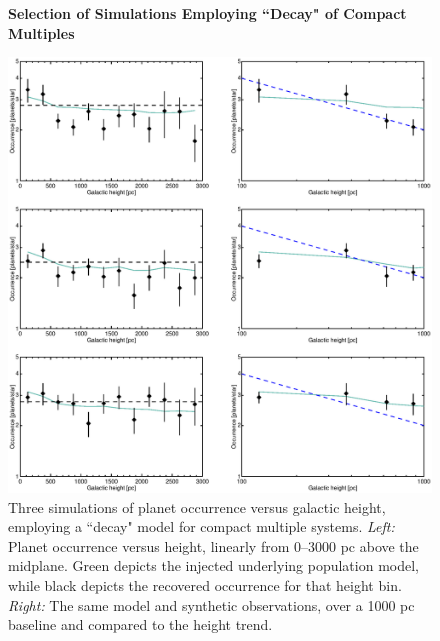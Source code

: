 \documentclass[twocolumn]{aastex631}
\begin{document}
\begin{figure}
    \centering
    \textbf{Selection of Simulations Employing ``Decay" of Compact Multiples}\par\medskip
    \includegraphics[trim={0.5cm 0 0.5cm 0}, width=6.0in]{figures/occurrence_height_kepler_decay.eps}
    \caption{Three simulations of planet occurrence versus galactic height, employing a ``decay" model for compact multiple systems. \textit{Left:} Planet occurrence versus height, linearly from 0--3000 pc above the midplane. Green depicts the injected underlying population model, while black depicts the recovered occurrence for that height bin. \textit{Right:} The same model and synthetic observations, over a 1000 pc baseline and compared to the \cite{zink_scaling_2023} height trend.}
    \label{fig:decay_iterations}
\end{figure}
\end{document}
